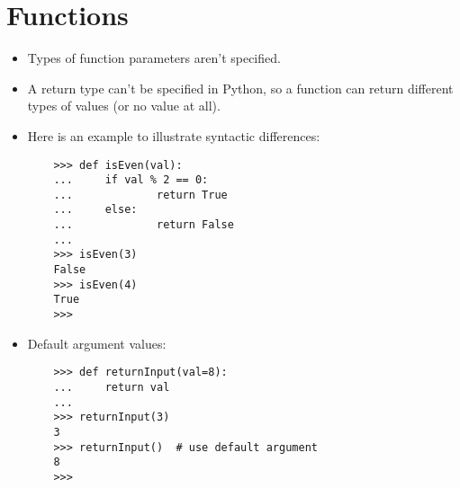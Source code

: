 \documentclass{article}
\begin{document}
\section{Functions}
\begin{itemize}
    \item Types of function parameters aren't specified.
    \item A return type can't be specified in Python, so a function can return different types of values (or no value at all).
    \item Here is an example to illustrate syntactic differences:
    \begin{lstlisting}
    >>> def isEven(val):
    ...     if val % 2 == 0:
    ...             return True
    ...     else:
    ...             return False
    ...
    >>> isEven(3)
    False
    >>> isEven(4)
    True
    >>>
    \end{lstlisting}
    \item Default argument values:
    \begin{lstlisting}
    >>> def returnInput(val=8):
    ...     return val
    ...
    >>> returnInput(3)
    3
    >>> returnInput()  # use default argument
    8
    >>>
    \end{lstlisting}
\end{itemize}
\end{document}
